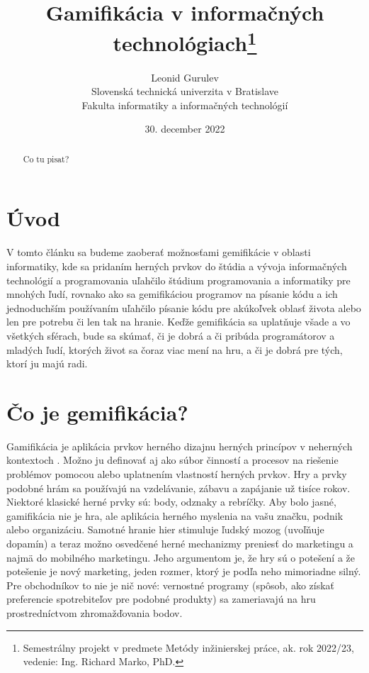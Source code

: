 \documentclass[14pt,twoside,a4paper]{article}
\title{Gamifikácia v informačných technológiach\thanks{Semestrálny projekt v predmete Metódy inžinierskej práce, ak. rok 2022/23, vedenie: Ing. Richard Marko, PhD.}}
\author{Leonid Gurulev\\[2pt]
	{\small Slovenská technická univerzita v Bratislave}\\
	{\small Fakulta informatiky a informačných technológií}\\
	{\small \text{qgurulev@stuba.sk}}
	}
\date{\small 30. december 2022}
\begin{document}
\maketitle
\begin{abstract}
Co tu pisat?
\end{abstract}

\section{Úvod}
V tomto článku sa budeme zaoberať možnosťami gemifikácie v oblasti informatiky, 
kde sa pridaním herných prvkov do štúdia a vývoja informačných technológií 
a programovania uľahčilo štúdium programovania a informatiky pre mnohých ľudí, 
rovnako ako sa gemifikáciou programov na písanie kódu 
a ich jednoduchším používaním uľahčilo písanie kódu pre 
akúkoľvek oblasť života alebo len pre potrebu 
či len tak na hranie. 
Keďže gemifikácia sa uplatňuje všade a vo všetkých sférach, 
bude sa skúmať, či je dobrá a či pribúda programátorov 
a mladých ľudí, ktorých život sa čoraz viac mení na hru, 
a či je dobrá pre tých, ktorí ju majú radi.




\section{Čo je gemifikácia?}

Gamifikácia je aplikácia prvkov herného dizajnu 
herných princípov v neherných kontextoch \cite{8166715}.
Možno ju definovať aj ako súbor činností a procesov na riešenie problémov pomocou alebo uplatnením vlastností herných prvkov\cite{gamify}.
Hry a prvky podobné hrám sa používajú na vzdelávanie, zábavu a zapájanie už tisíce rokov. Niektoré klasické herné prvky sú: body, odznaky a rebríčky.
Aby bolo jasné, gamifikácia nie je hra, ale aplikácia herného myslenia na vašu značku, podnik alebo organizáciu. Samotné hranie hier stimuluje ľudský mozog (uvoľňuje dopamín) a teraz možno osvedčené herné mechanizmy preniesť do marketingu a najmä do mobilného marketingu. Jeho argumentom je, že hry sú o potešení a že potešenie je nový marketing, jeden rozmer, ktorý je podľa neho mimoriadne silný.
Pre obchodníkov to nie je nič nové: vernostné programy (spôsob, ako získať preferencie spotrebiteľov pre podobné produkty) sa zameriavajú na hru prostredníctvom zhromažďovania bodov\cite{smarting}.
\end{document}
